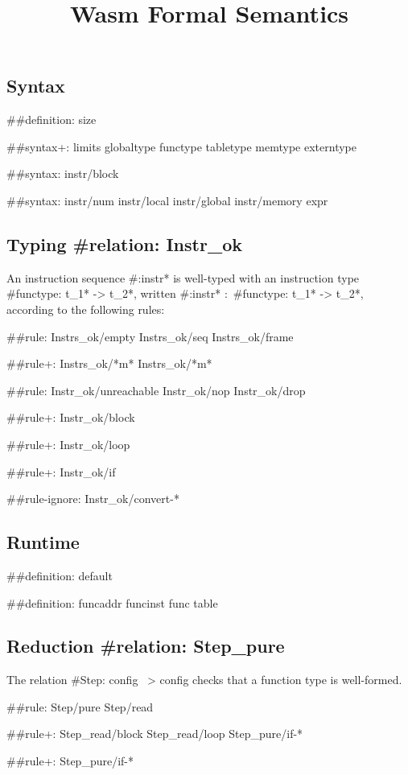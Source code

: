\documentclass[a4paper]{scrartcl}
\title{Wasm Formal Semantics}
\begin{document}
\small

\maketitle


\subsection*{Syntax}

##{definition: size}

##{syntax+:
  limits
  {globaltype
  functype
  tabletype
  memtype}
  {}
  externtype
}

##{syntax: {instr/block}}

##{syntax: {instr/num instr/local instr/global instr/memory} expr}


\subsection*{Typing #{relation: Instr_ok}}

An instruction sequence #{:instr*} is well-typed with an instruction type #{functype: t_1* -> t_2*}, written #{:instr*} $:$ #{functype: t_1* -> t_2*}, according to the following rules:

##{rule:
  {Instrs_ok/empty Instrs_ok/seq}
  {Instrs_ok/frame}
}

##{rule+: Instrs_ok/*m* {Instrs_ok/*m*}}

##{rule: {Instr_ok/unreachable Instr_ok/nop Instr_ok/drop}}

##{rule+: Instr_ok/block}

##{rule+: Instr_ok/loop}

##{rule+: Instr_ok/if}


##{rule-ignore: Instr_ok/convert-*}


\subsection*{Runtime}

##{definition: default}

##{definition: {funcaddr funcinst} {func table}}


\subsection*{Reduction #{relation: Step_pure}}

The relation #{Step: config ~> config} checks that a function type is well-formed.

##{rule: Step/pure Step/read}

##{rule+: {Step_read/block Step_read/loop} {Step_pure/if-*}}

##{rule+: Step_pure/if-*}
\end{document}
